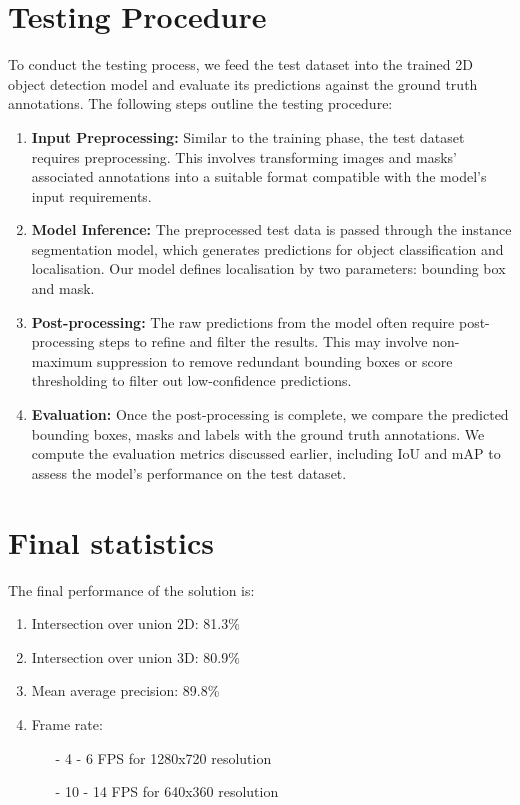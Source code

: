 \section{Testing Procedure}
To conduct the testing process, we feed the test dataset into the trained 2D object detection model and evaluate its predictions against the ground truth annotations. The following steps outline the testing procedure:

\begin{enumerate}
    \item \textbf{Input Preprocessing:} Similar to the training phase, the test dataset requires preprocessing. This involves transforming images and masks' associated annotations into a suitable format compatible with the model's input requirements.
    \item \textbf{Model Inference:} The preprocessed test data is passed through the instance segmentation model, which generates predictions for object classification and localisation. Our model defines localisation by two parameters: bounding box and mask.
    \item \textbf{Post-processing:} The raw predictions from the model often require post-processing steps to refine and filter the results. This may involve non-maximum suppression to remove redundant bounding boxes or score thresholding to filter out low-confidence predictions.
    \item \textbf{Evaluation:} Once the post-processing is complete, we compare the predicted bounding boxes, masks and labels with the ground truth annotations. We compute the evaluation metrics discussed earlier, including IoU and mAP to assess the model's performance on the test dataset.
\end{enumerate}

\section{Final statistics}
The final performance of the solution is: 
\begin{enumerate}[noitemsep]
    \item Intersection over union 2D: 81.3\%
    \item Intersection over union 3D: 80.9\%
    \item Mean average precision: 89.8\%
    \item Frame rate: 
    \begin{enumerate}[noitemsep, topsep=0pt]
        \item[-] 4 - 6 FPS for 1280x720 resolution 
        \item[-] 10 - 14 FPS for 640x360 resolution
    \end{enumerate}
\end{enumerate}